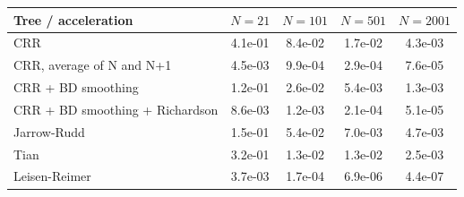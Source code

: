 \begin{tabular}{lcccc}
\toprule
Tree / acceleration & $N=21$ & $N=101$ & $N=501$ & $N=2001$ \\
\midrule
CRR & 4.1e-01 & 8.4e-02 & 1.7e-02 & 4.3e-03 \\
CRR, average of N and N+1 & 4.5e-03 & 9.9e-04 & 2.9e-04 & 7.6e-05 \\
CRR + BD smoothing & 1.2e-01 & 2.6e-02 & 5.4e-03 & 1.3e-03 \\
CRR + BD smoothing + Richardson & 8.6e-03 & 1.2e-03 & 2.1e-04 & 5.1e-05 \\
Jarrow-Rudd & 1.5e-01 & 5.4e-02 & 7.0e-03 & 4.7e-03 \\
Tian & 3.2e-01 & 1.3e-02 & 1.3e-02 & 2.5e-03 \\
Leisen-Reimer & 3.7e-03 & 1.7e-04 & 6.9e-06 & 4.4e-07 \\
\bottomrule
\end{tabular}
